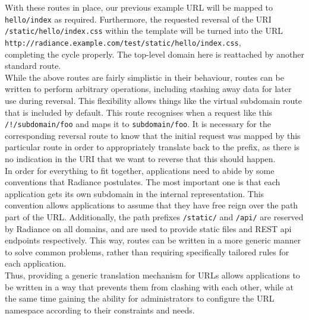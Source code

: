 \documentclass{sig-alternate}
\begin{document}
With these routes in place, our previous example URL will be mapped to \texttt{hello/index} as required. Furthermore, the requested reversal of the URI \texttt{/static/hello/index.css} within the template will be turned into the URL \\\texttt{\small http://radiance.example.com/test/static/hello/index.css},\\ completing the cycle properly. The top-level domain here is reattached by another standard route. \\

While the above routes are fairly simplistic in their behaviour, routes can be written to perform arbitrary operations, including stashing away data for later use during reversal. This flexibility allows things like the virtual subdomain route that is included by default. This route recognises when a request like this \texttt{/!/subdomain/foo} and maps it to \texttt{subdomain/foo}. It is necessary for the corresponding reversal route to know that the initial request was mapped by this particular route in order to appropriately translate back to the prefix, as there is no indication in the URI that we want to reverse that this should happen. \\

In order for everything to fit together, applications need to abide by some conventions that Radiance postulates. The most important one is that each application gets its own subdomain in the internal representation. This convention allows applications to assume that they have free reign over the path part of the URL. Additionally, the path prefixes \texttt{/static/} and \texttt{/api/} are reserved by Radiance on all domains, and are used to provide static files and REST api endpoints respectively. This way, routes can be written in a more generic manner to solve common problems, rather than requiring specifically tailored rules for each application. \\

Thus, providing a generic translation mechanism for URLs allows applications to be written in a way that prevents them from clashing with each other, while at the same time gaining the ability for administrators to configure the URL namespace according to their constraints and needs. \\
\end{document}
